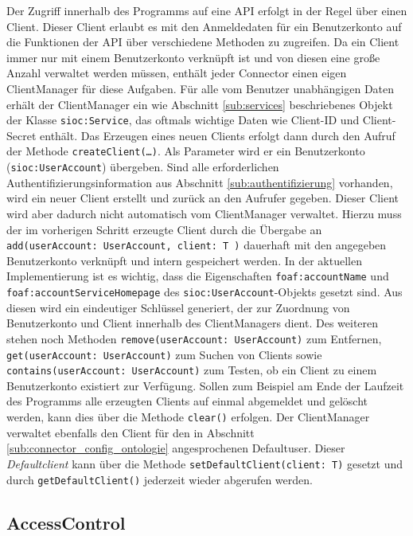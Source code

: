 Der Zugriff innerhalb des Programms auf eine API erfolgt in der Regel über einen Client. Dieser Client erlaubt es mit den Anmeldedaten für ein Benutzerkonto auf die Funktionen der API über verschiedene Methoden zu zugreifen. Da ein Client immer nur mit einem Benutzerkonto verknüpft ist und von diesen eine große Anzahl verwaltet werden müssen, enthält jeder Connector einen eigen ClientManager für diese Aufgaben. Für alle vom Benutzer unabhängigen Daten erhält der ClientManager ein wie Abschnitt \ref{sub:services} beschriebenes Objekt der Klasse \texttt{sioc:Service}, das oftmals wichtige Daten wie Client-ID und Client-Secret enthält. Das Erzeugen eines neuen Clients erfolgt dann durch den Aufruf der Methode \texttt{createClient(\dots)}. Als Parameter wird er ein Benutzerkonto (\texttt{sioc:UserAccount}) übergeben. Sind alle erforderlichen Authentifizierungsinformation aus Abschnitt \ref{sub:authentifizierung} vorhanden, wird ein neuer Client erstellt und zurück an den Aufrufer gegeben. Dieser Client wird aber dadurch nicht automatisch vom ClientManager verwaltet. Hierzu muss der im vorherigen Schritt erzeugte Client durch die Übergabe an \texttt{add(userAccount: UserAccount, client: T )} dauerhaft mit den angegeben Benutzerkonto verknüpft und intern gespeichert werden. In der aktuellen Implementierung ist es wichtig, dass die Eigenschaften \texttt{foaf:accountName} und \texttt{foaf:accountServiceHomepage} des \texttt{sioc:UserAccount}-Objekts gesetzt sind. Aus diesen wird ein eindeutiger Schlüssel generiert, der zur Zuordnung von Benutzerkonto und Client innerhalb des ClientManagers dient. Des weiteren stehen noch Methoden \texttt{remove(userAccount: UserAccount)} zum Entfernen, \texttt{get(userAccount: UserAccount)} zum Suchen von Clients sowie \texttt{contains(userAccount: UserAccount)} zum Testen, ob ein Client zu einem Benutzerkonto existiert zur Verfügung. Sollen zum Beispiel am Ende der Laufzeit des Programms alle erzeugten Clients auf einmal abgemeldet und gelöscht werden, kann dies über die Methode \texttt{clear()} erfolgen. Der ClientManager verwaltet ebenfalls den Client für den in Abschnitt \ref{sub:connector_config_ontologie} angesprochenen Defaultuser. Dieser \emph{Defaultclient} kann über die Methode  \texttt{setDefaultClient(client: T)} gesetzt und durch \texttt{getDefaultClient()} jederzeit wieder abgerufen werden. 


\subsection{AccessControl} %
\label{sub:accesscontrol}

